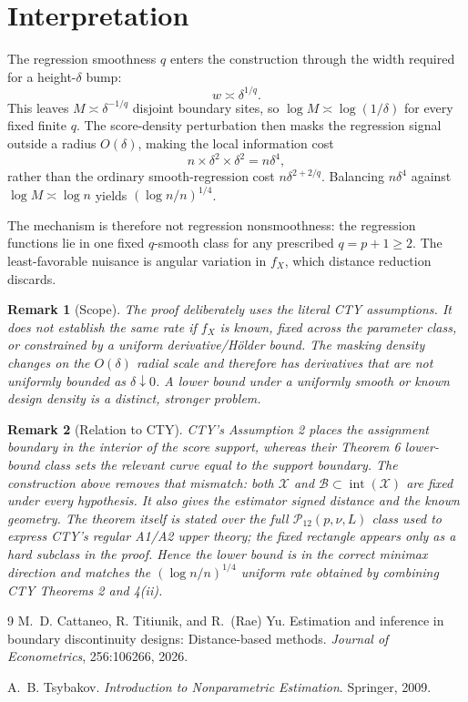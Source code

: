 \documentclass[11pt]{article}
\newtheorem{remark}{Remark}
\newcommand{\cB}{\mathcal B}
\newcommand{\cX}{\mathcal X}
\newcommand{\1}{\mathbf 1}
\begin{document}
\section{Interpretation}

The regression smoothness $q$ enters the construction through the width required for a height-$\delta$ bump:
\[
w\asymp\delta^{1/q}.
\]
This leaves $M\asymp\delta^{-1/q}$ disjoint boundary sites, so $\log M\asymp\log(1/\delta)$ for every fixed finite $q$.  The score-density perturbation then masks the regression signal outside a radius $O(\delta)$, making the local information cost
\[
n\times \delta^2\times \delta^2=n\delta^4,
\]
rather than the ordinary smooth-regression cost $n\delta^{2+2/q}$.  Balancing $n\delta^4$ against $\log M\asymp\log n$ yields $(\log n/n)^{1/4}$.

The mechanism is therefore not regression nonsmoothness: the regression functions lie in one fixed $q$-smooth class for any prescribed $q=p+1\ge2$.  The least-favorable nuisance is angular variation in $f_X$, which distance reduction discards.

\begin{remark}[Scope]
The proof deliberately uses the literal CTY assumptions.  It does \emph{not} establish the same rate if $f_X$ is known, fixed across the parameter class, or constrained by a uniform derivative/H\"older bound.  The masking density changes on the $O(\delta)$ radial scale and therefore has derivatives that are not uniformly bounded as $\delta\downarrow0$.  A lower bound under a uniformly smooth or known design density is a distinct, stronger problem.
\end{remark}

\begin{remark}[Relation to CTY]
CTY's Assumption 2 places the assignment boundary in the interior of the score support, whereas their Theorem 6 lower-bound class sets the relevant curve equal to the support boundary.  The construction above removes that mismatch: both $\cX$ and $\cB\subset\operatorname{int}(\cX)$ are fixed under every hypothesis.  It also gives the estimator signed distance and the known geometry.  The theorem itself is stated over the full $\mathcal P_{12}(p,\nu,L)$ class used to express CTY's regular A1/A2 upper theory; the fixed rectangle appears only as a hard subclass in the proof.  Hence the lower bound is in the correct minimax direction and matches the $(\log n/n)^{1/4}$ uniform rate obtained by combining CTY Theorems 2 and 4(ii).
\end{remark}

\begin{thebibliography}{9}
M.~D. Cattaneo, R. Titiunik, and R.~(Rae) Yu.
\newblock Estimation and inference in boundary discontinuity designs: Distance-based methods.
\newblock \emph{Journal of Econometrics}, 256:106266, 2026.

A.~B. Tsybakov.
\newblock \emph{Introduction to Nonparametric Estimation}.
\newblock Springer, 2009.
\end{thebibliography}
\end{document}
